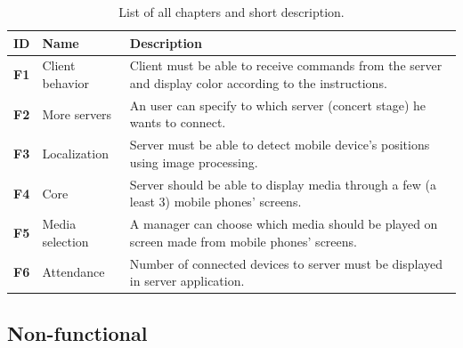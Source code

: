 \begin{table}[!h]\centering
\caption{List of all chapters and short description. }
\label{tab:req_func}
\def\arraystretch{1.3}
\begin{tabularx}{\textwidth}{llX}
\toprule[1mm]
\textbf{ID} & Name & Description\\
\midrule

\label{req_F1}\textbf{F1} 
	& Client behavior 
	& Client must be able to receive commands from the server and display color according to the instructions.\\
	
\label{req_F2}\textbf{F2} 
	& More servers 
	& An user can specify to which server (concert stage) he wants to connect.\\

\label{req_F3}\textbf{F3} 
	& Localization 
	& Server must be able to detect mobile device's positions using image processing.\\

\label{req_F4}\textbf{F4} 
	& Core 
	& Server should be able to display media through a few (a least 3) mobile phones' screens.\\
	
\label{req_F5}\textbf{F5} 
	& Media selection 
	& A manager can choose which media should be played on screen made from mobile phones' screens.\\
	
\label{req_F6}\textbf{F6} 
	& Attendance 
	& Number of connected devices to server must be displayed in server application. \\

\bottomrule[1mm]

\end{tabularx}
\end{table}

\subsection{Non-functional}

